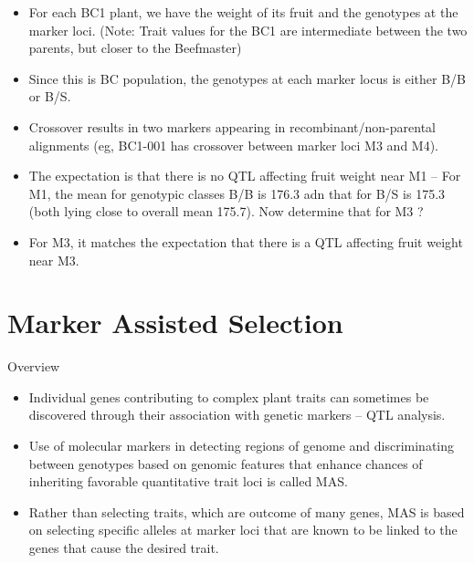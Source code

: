 \documentclass[
  ignorenonframetext,
  aspectratio=169]{beamer}
\providecommand{\tightlist}{%
  \setlength{\itemsep}{0pt}\setlength{\parskip}{0pt}}
\begin{document}
\begin{frame}{}
\protect\hypertarget{section-1}{}
\begin{itemize}
\tightlist
\item
  For each BC1 plant, we have the weight of its fruit and the genotypes
  at the marker loci. (Note: Trait values for the BC1 are intermediate
  between the two parents, but closer to the Beefmaster)
\item
  Since this is BC population, the genotypes at each marker locus is
  either B/B or B/S.
\item
  Crossover results in two markers appearing in recombinant/non-parental
  alignments (eg, BC1-001 has crossover between marker loci M3 and M4).
\item
  The expectation is that there is no QTL affecting fruit weight near M1
  -- For M1, the mean for genotypic classes B/B is 176.3 adn that for
  B/S is 175.3 (both lying close to overall mean 175.7). Now determine
  that for M3 ?
\item
  For M3, it matches the expectation that there is a QTL affecting fruit
  weight near M3.
\end{itemize}
\end{frame}

\hypertarget{marker-assisted-selection}{%
\section{Marker Assisted Selection}\label{marker-assisted-selection}}

\begin{frame}{Overview}
\protect\hypertarget{overview-1}{}
\begin{itemize}
\tightlist
\item
  Individual genes contributing to complex plant traits can sometimes be
  discovered through their association with genetic markers --
  \alert{QTL analysis}.
\item
  Use of molecular markers in detecting regions of genome and
  discriminating between genotypes based on genomic features that
  enhance chances of inheriting favorable quantitative trait loci is
  called MAS.
\item
  Rather than selecting traits, which are outcome of many genes, MAS is
  based on selecting specific alleles at marker loci that are known to
  be linked to the genes that cause the desired trait.
\end{itemize}
\end{frame}
\end{document}
